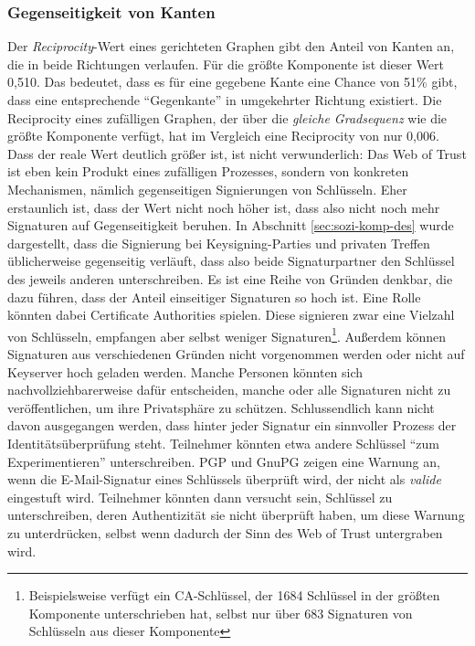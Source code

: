 \subsubsection{Gegenseitigkeit von Kanten}
\label{sec:gegens-von-kant}

Der \emph{Reciprocity}-Wert eines gerichteten Graphen gibt den Anteil
von Kanten an, die in beide Richtungen verlaufen. Für die größte
Komponente ist dieser Wert 0,510. Das bedeutet, dass es für eine
gegebene Kante eine Chance von 51\% gibt, dass eine entsprechende
``Gegenkante'' in umgekehrter Richtung existiert. Die Reciprocity
eines zufälligen Graphen, der über die \emph{gleiche Gradsequenz}
wie die größte Komponente verfügt, hat im Vergleich eine
Reciprocity von nur 0,006. Dass der reale Wert deutlich größer ist,
ist nicht verwunderlich: Das Web of Trust ist eben kein Produkt eines
zufälligen Prozesses, sondern von konkreten Mechanismen, nämlich
gegenseitigen Signierungen von Schlüsseln. Eher erstaunlich ist,
dass der Wert nicht noch höher ist, dass also nicht noch mehr
Signaturen auf Gegenseitigkeit beruhen. In Abschnitt
\ref{sec:sozi-komp-des} wurde dargestellt, dass die Signierung bei
Keysigning-Parties und privaten Treffen üblicherweise gegenseitig
verläuft, dass also beide Signaturpartner den Schlüssel des
jeweils anderen unterschreiben. Es ist eine Reihe von Gründen
denkbar, die dazu führen, dass der Anteil einseitiger Signaturen so
hoch ist. Eine Rolle könnten dabei Certificate Authorities
spielen. Diese signieren zwar eine Vielzahl von Schlüsseln,
empfangen aber selbst weniger Signaturen\footnote{Beispielsweise
  verfügt ein CA-Schlüssel, der 1684 Schlüssel in der größten
  Komponente unterschrieben hat, selbst nur über 683 Signaturen von
  Schlüsseln aus dieser Komponente}. Außerdem können Signaturen
aus verschiedenen Gründen nicht vorgenommen werden oder nicht auf
Keyserver hoch geladen werden. Manche Personen könnten sich
nachvollziehbarerweise dafür entscheiden, manche oder alle
Signaturen nicht zu veröffentlichen, um ihre Privatsphäre zu
schützen. Schlussendlich kann nicht davon ausgegangen werden, dass
hinter jeder Signatur ein sinnvoller Prozess der
Identitätsüberprüfung steht. Teilnehmer könnten etwa andere
Schlüssel ``zum Experimentieren'' unterschreiben. PGP und GnuPG
zeigen eine Warnung an, wenn die E-Mail-Signatur eines Schlüssels
überprüft wird, der nicht als \emph{valide} eingestuft
wird. Teilnehmer könnten dann versucht sein, Schlüssel zu
unterschreiben, deren Authentizität sie nicht überprüft haben,
um diese Warnung zu unterdrücken, selbst wenn dadurch der Sinn des
Web of Trust untergraben wird.

